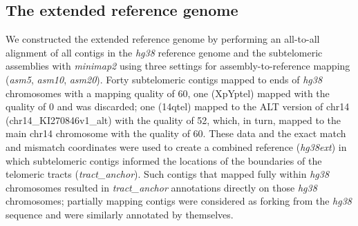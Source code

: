 \documentclass{article}
\begin{document}
\subsection*{The extended reference genome}
We constructed the extended reference genome by performing an all-to-all alignment of all contigs in the \textit{hg38} reference genome \cite{grch38,hg38} and the subtelomeric assemblies \cite{riethman2014} with \textit{minimap2} \cite{minimap} using three settings for assembly-to-reference mapping (\textit{asm5}, \textit{asm10}, \textit{asm20}).
Forty subtelomeric contigs mapped to ends of \textit{hg38} chromosomes with a mapping quality of 60, one (XpYptel) mapped with the quality of 0 and was discarded; one (14qtel) mapped to the ALT version of chr14 (chr14\_KI270846v1\_alt) with the quality of 52, which, in turn, mapped to the main chr14 chromosome with the quality of 60. %
These data and the exact match and mismatch coordinates were used to create a combined reference (\textit{hg38ext}) in which subtelomeric contigs informed the locations of the boundaries of the telomeric tracts (\textit{tract\_anchor}).
Such contigs that mapped fully within \textit{hg38} chromosomes resulted in \textit{tract\_anchor} annotations directly on those \textit{hg38} chromosomes; partially mapping contigs were considered as forking from the \textit{hg38} sequence and were similarly annotated by themselves.
\end{document}

